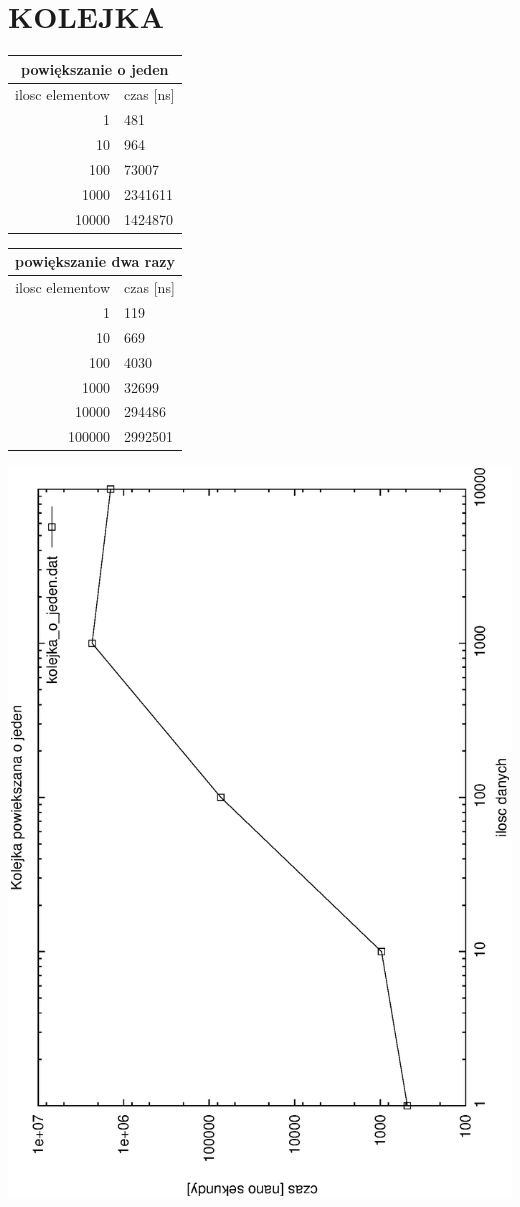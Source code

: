 \documentclass[a4paper,11pt]{report}
\begin{document}
\section{KOLEJKA}
\begin{tabular}{|rl|}
\hline
\multicolumn{2}{|c|}{powiększanie o jeden}\\
\hline
ilosc elementow & czas [ns]\\
\hline
1&481\\
10&964\\
100&73007\\
1000&2341611\\
10000&1424870\\
\hline
\end{tabular}
\newline
\newline
\begin{tabular}{|rl|}
\hline
\multicolumn{2}{|c|}{powiększanie dwa razy}\\
\hline
ilosc elementow & czas [ns]\\
\hline
1&119\\
10&669\\
100&4030\\
1000&32699\\
10000&294486\\
100000&2992501\\
\hline
\end{tabular}
\newline
\newline
\includegraphics[scale=0.55, angle=270]{wykresy/kolejka_o_jeden.eps}
\end{document}
